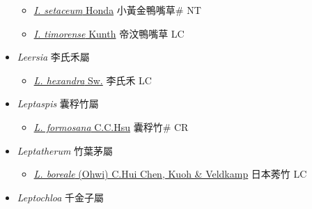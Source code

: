 \begin{itemize}
\begin{itemize}
        \item[] \href{http://www.theplantlist.org/tpl1.1/search?q=Ischaemum+setaceum}{\textit{I. setaceum} Honda}   小黃金鴨嘴草\# NT
        \item[] \href{http://www.theplantlist.org/tpl1.1/search?q=Ischaemum+timorense}{\textit{I. timorense} Kunth}   帝汶鴨嘴草 LC
  \end{itemize}
 \item[] \textit{Leersia} 李氏禾屬
                    
  \begin{itemize}
        \item[] \href{http://www.theplantlist.org/tpl1.1/search?q=Leersia+hexandra}{\textit{L. hexandra} Sw.}   李氏禾 LC
  \end{itemize}
 \item[] \textit{Leptaspis} 囊稃竹屬
                    
  \begin{itemize}
        \item[] \href{http://www.theplantlist.org/tpl1.1/search?q=Leptaspis+formosana}{\textit{L. formosana} C.C.Hsu}   囊稃竹\# CR
  \end{itemize}
 \item[] \textit{Leptatherum} 竹葉茅屬
                    
  \begin{itemize}
        \item[] \href{http://www.theplantlist.org/tpl1.1/search?q=Leptatherum+boreale}{\textit{L. boreale} (Ohwi) C.Hui Chen, Kuoh \& Veldkamp}   日本莠竹 LC
  \end{itemize}
 \item[] \textit{Leptochloa} 千金子屬
                    

\end{itemize}
